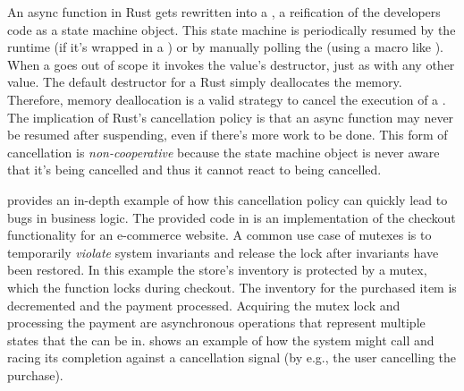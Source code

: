 %
%
%
%

An async function in Rust gets rewritten into a \coro, a reification of the developers code as a state machine object. This state machine is periodically resumed by the runtime (if it's wrapped in a \task) or by manually polling the \coro (using a macro like ). When a \coro goes out of scope it invokes the value's destructor, just as with any other value. The default destructor for a Rust \coro simply deallocates the memory. Therefore, memory deallocation is a valid strategy to cancel the execution of a \coro. The implication of Rust's cancellation policy is that an async function may never be resumed after suspending, even if there's more work to be done. This form of cancellation is \textit{non-cooperative} because the state machine object is never aware that it's being cancelled and thus it cannot react to being cancelled.

 provides an in-depth example of how this cancellation policy can quickly lead to bugs in business logic. The provided code in  is an implementation of the checkout functionality for an e-commerce website. A common use case of mutexes is to temporarily \textit{violate} system invariants and release the lock after invariants have been restored. In this example the store's inventory is protected by a mutex, which the  function locks during checkout. The inventory for the purchased item is decremented and the payment processed. Acquiring the mutex lock and processing the payment are asynchronous operations that represent multiple states that the \coro can be in.  shows an example of how the system might call  and racing its completion against a cancellation signal (by e.g., the user cancelling the purchase).

